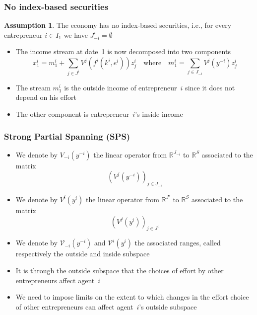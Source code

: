 \documentclass[blue]{beamer}
\def\R{\mathbb{R}}
\theoremstyle{definition}
\newtheorem*{assumption}{Assumption}
\theoremstyle{example}
\begin{document}
\begin{frame}\frametitle{No index-based securities}

\begin{assumption}
The economy has no index-based securities, i.e., for every entrepreneur $i\in I_1$ we have $J^i_{-i} = \emptyset$
\end{assumption}

\begin{itemize}
\item The income stream at date~1 is now decomposed into two components
\[
x^i_1 = m^i_1 + \sum_{j\in J^i} V^j(f^i(k^i,e^i))z^i_j \quad \textrm{where} \quad m^i_1 = \sum_{j\in J_{-i}} V^j(y^{-i})z^i_j
\]
\item The stream $m^i_1$ is the \alert{outside income} of entrepreneur~$i$ since it does not depend on his effort
\item The other component is entrepreneur~$i$'s \alert{inside income}
\end{itemize}

\end{frame}


\begin{frame}\frametitle{Strong Partial Spanning (SPS)}

\begin{itemize}
\item We denote by $V_{-i}(y^{-i})$ the linear operator from $\R^{J_{-i}}$ to $\R^S$ associated to the matrix
\[
(V^j(y^{-i}))_{j\in J_{-i}}
\]
\item We denote by $V^i(y^i)$ the linear operator from $\R^{J^i}$ to $\R^S$ associated to the matrix
\[
(V^j(y^{i}))_{j\in J^i}
\]
\item We denote by $\mathcal{V}_{-i}(y^{-i})$ and $\mathcal{V}^i(y^i)$ the associated ranges, called respectively the \alert{outside} and \alert{inside subspace}
\item It is through the outside subspace that the choices of effort by other entrepreneurs affect agent~$i$
\item We need to impose limits on the extent to which changes in the effort choice of other entrepreneurs can affect agent~$i$'s outside subspace
\end{itemize}

\end{frame}

\end{document}
